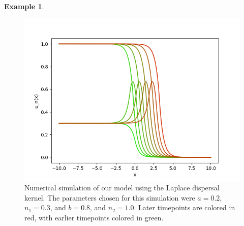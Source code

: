 \documentclass[11pt]{article}
\theoremstyle{definition}
\newtheorem{ex}[thm]{Example}
\numberwithin{equation}{section}
\numberwithin{thm}{section}
\renewcommand{\a}{a}
\renewcommand{\b}{b}
\newcommand{\m}{n_1}
\newcommand{\mtwo}{n_2}
\begin{document}
\begin{ex}
\begin{figure}[h!] 
\centering
  \caption{Numerical simulation of our model using the Laplace dispersal kernel. The parameters chosen for this simulation were $\a=0.2$, $\m=0.3$, and $\b=0.8$, and $\mtwo=1.0$. Later timepoints are colored in red, with earlier timepoints colored in green.}
\label{fig3}
  \includegraphics[width=.8\linewidth]{figures/fig3.png}
\end{figure}



\end{ex}
\end{document}
